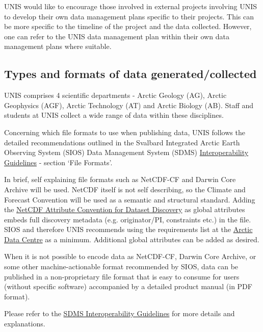 \documentclass[a4paper,english, 11pt]{article}
\begin{document}
UNIS would like to encourage those involved in external projects involving UNIS to develop their own data management plans specific to their projects. This can be more specific to the timeline of the project and the data collected. However, one can refer to the UNIS data management plan within their own data management plans where suitable.

\subsection{Types and formats of data generated/collected}
\label{ss:datatypes}

UNIS comprises 4 scientific departments - Arctic Geology (AG), Arctic Geophysics (AGF), Arctic Technology (AT) and Arctic Biology (AB). Staff and students at UNIS collect a wide range of data within these disciplines.

Concerning which file formats to use when publishing data, UNIS follows the detailed recommendations outlined in the Svalbard Integrated Arctic Earth Observing System (SIOS) Data Management System (SDMS) \href{https://sios-svalbard.org/sites/sios-svalbard.org/files/common/SDMS_Interoperability_Guidelines.pdf}{Interoperability Guidelines} - section `File Formats'.

In brief, self explaining file formats such as NetCDF-CF and Darwin Core Archive will be used. NetCDF itself is not self describing, so the Climate and Forecast Convention will be used as a semantic and structural standard. Adding the \href{https://wiki.esipfed.org/Attribute_Convention_for_Data_Discovery_1-3}{NetCDF Attribute Convention for Dataset Discovery} as global attributes embeds full discovery
metadata (e.g. originator/PI, constraints etc.) in the file. SIOS and therefore UNIS recommends using the requirements list at the \href{https://adc.met.no/submit-data-as-netcdf-cf}{Arctic Data Centre} as a minimum. Additional global attributes can be added as desired.

When it is not possible to encode data as NetCDF-CF, Darwin Core Archive, or some other machine-actionable format recommended by SIOS, data can be published in a non-proprietary file format that is easy to consume for users (without specific software) accompanied by a detailed product manual (in PDF format).

Please refer to the \href{https://sios-svalbard.org/sites/sios-svalbard.org/files/common/SDMS_Interoperability_Guidelines.pdf}{SDMS Interoperability Guidelines} for more details and explanations.
\end{document}
